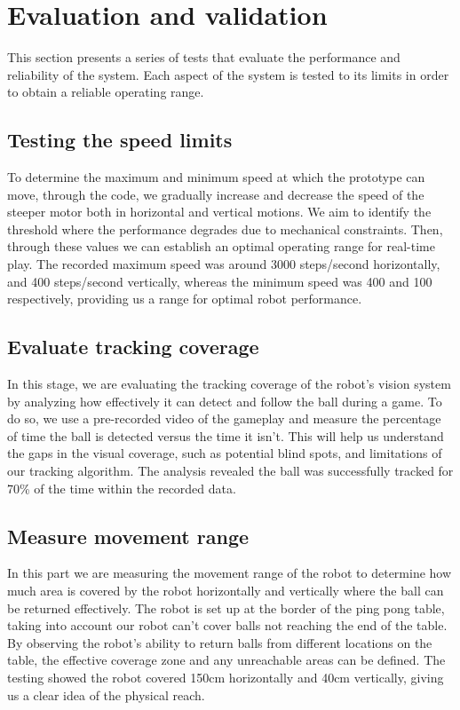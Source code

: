 \chapter{Evaluation and validation}
This section presents a series of tests that evaluate the performance and reliability of the system. Each aspect of the system is tested to its limits in order to obtain a reliable operating range.
\section{Testing the speed limits}
To determine the maximum and minimum speed at which the prototype can move, through the code, we gradually increase and decrease the speed of the steeper motor both in horizontal and vertical motions. 
We aim to identify the threshold where the performance degrades due to mechanical constraints. 
Then, through these values we can establish an optimal operating range for real-time play. 
The recorded maximum speed was around 3000 steps/second horizontally, and 400 steps/second vertically, whereas the minimum speed was 400 and 100 respectively, providing us a range for optimal robot performance.

\section{Evaluate tracking coverage}
In this stage, we are evaluating the tracking coverage of the robot's vision system by analyzing how effectively it can detect and follow the ball during a game. 
To do so, we use a pre-recorded video of the gameplay and measure the percentage of time the ball is detected versus the time it isn't. 
This will help us understand the gaps in the visual coverage, such as potential blind spots, and limitations of our tracking algorithm. 
The analysis revealed the ball was successfully tracked for 70\% of the time within the recorded data.

\section{Measure movement range}
In this part we are measuring the movement range of the robot to determine how much area is covered by the robot horizontally and vertically where the ball can be returned effectively. 
The robot is set up at the border of the ping pong table, taking into account our robot can't cover balls not reaching the end of the table. 
By observing the robot's ability to return balls from different locations on the table, the effective coverage zone and any unreachable areas can be defined. 
The testing showed the robot covered 150cm horizontally and 40cm vertically, giving us a clear idea of the physical reach.

